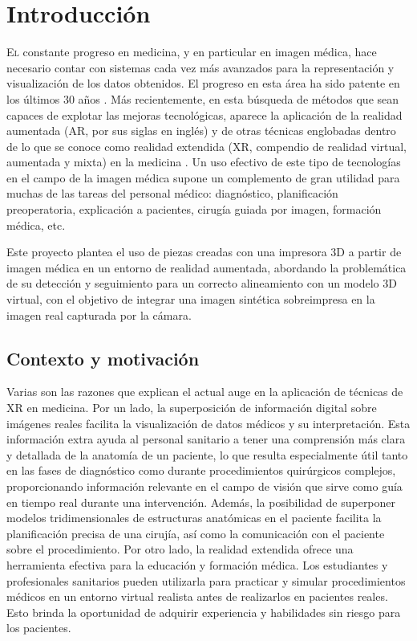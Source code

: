 \chapter{Introducción}
\label{chap:introducion}

\lettrine{E}{l} constante progreso en medicina, y en particular en imagen médica, hace necesario contar con sistemas cada vez más avanzados para la representación y visualización de los datos obtenidos. El progreso en esta área ha sido patente en los últimos 30 años \cite{Botha2014}. Más recientemente, en esta búsqueda de métodos que sean capaces de explotar las mejoras tecnológicas, aparece la aplicación de la realidad aumentada (AR, por sus siglas en inglés) y de otras técnicas englobadas dentro de lo que se conoce como realidad extendida (XR, compendio de realidad virtual, aumentada y mixta) en la medicina \cite{Sielhorst2008}. Un uso efectivo de este tipo de tecnologías en el campo de la imagen médica supone un complemento de gran utilidad para muchas de las tareas del personal médico: diagnóstico, planificación preoperatoria, explicación a pacientes, cirugía guiada por imagen, formación médica, etc.

Este proyecto plantea el uso de piezas creadas con una impresora 3D a partir de imagen médica en un entorno de realidad aumentada, abordando la problemática de su detección y seguimiento para un correcto alineamiento con un modelo 3D virtual, con el objetivo de integrar una imagen sintética sobreimpresa en la imagen real capturada por la cámara.


\section{Contexto y motivación}

Varias son las razones que explican el actual auge en la aplicación de técnicas de XR en medicina. Por un lado, la superposición de información digital sobre imágenes reales facilita la visualización de datos médicos y su interpretación. Esta información extra ayuda al personal sanitario a tener una comprensión más clara y detallada de la anatomía de un paciente, lo que resulta especialmente útil tanto en las fases de diagnóstico como durante procedimientos quirúrgicos complejos, proporcionando información relevante en el campo de visión que sirve como guía en tiempo real durante una intervención. Además, la posibilidad de superponer modelos tridimensionales de estructuras anatómicas en el paciente facilita la planificación precisa de una cirujía, así como la comunicación con el paciente sobre el procedimiento. Por otro lado, la realidad extendida ofrece una herramienta efectiva para la educación y formación médica. Los estudiantes y profesionales sanitarios pueden utilizarla para practicar y simular procedimientos médicos en un entorno virtual realista antes de realizarlos en pacientes reales. Esto brinda la oportunidad de adquirir experiencia y habilidades sin riesgo para los pacientes.

